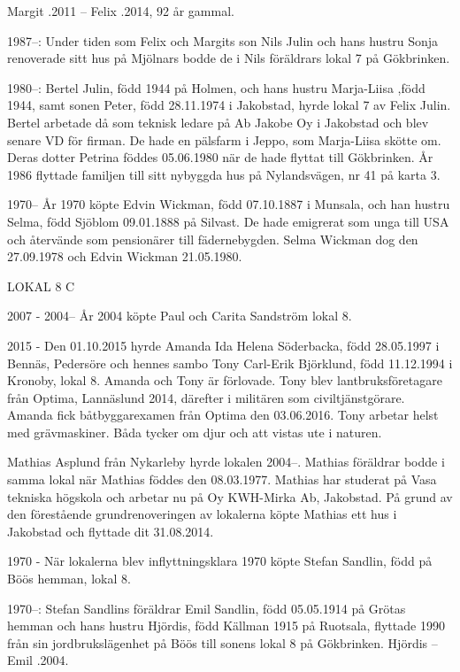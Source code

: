 Margit .2011  --  Felix .2014, 92 år gammal.


1987--:	Under tiden som Felix och Margits son Nils Julin och hans hustru Sonja renoverade sitt hus på Mjölnars bodde de i Nils föräldrars lokal 7 på Gökbrinken.

1980--:	Bertel Julin, född 1944 på Holmen, och hans hustru Marja-Liisa ,född 1944, samt sonen Peter, född 28.11.1974 i Jakobstad, hyrde lokal 7 av Felix Julin. Bertel arbetade då som teknisk ledare på Ab Jakobe Oy i Jakobstad och blev senare VD för firman. De hade en pälsfarm i Jeppo, som Marja-Liisa skötte om. Deras dotter Petrina föddes 05.06.1980 när de hade flyttat till Gökbrinken. År 1986 flyttade familjen till sitt nybyggda hus på Nylandsvägen, nr 41 på karta 3.

 1970--
År 1970 köpte Edvin Wickman, född 07.10.1887 i Munsala, och han hustru Selma, född Sjöblom 09.01.1888 på Silvast. De hade emigrerat som unga till USA och återvände som pensionärer till fädernebygden. Selma Wickman dog den 27.09.1978 och Edvin Wickman 21.05.1980.


LOKAL 8 C

 2007 -
 2004--
År 2004 köpte Paul och Carita Sandström lokal 8.

	2015 -
Den 01.10.2015 hyrde Amanda Ida Helena Söderbacka, född 28.05.1997 i Bennäs, Pedersöre och hennes sambo Tony Carl-Erik Björklund, född 11.12.1994 i Kronoby, lokal 8. Amanda och Tony är förlovade. Tony blev lantbruksföretagare från Optima, Lannäslund 2014, därefter i militären som civiltjänstgörare. Amanda fick båtbyggarexamen från Optima den 03.06.2016. Tony arbetar helst med grävmaskiner. Båda tycker om djur och att vistas ute i naturen.

Mathias Asplund från Nykarleby hyrde lokalen 2004--. Mathias föräldrar bodde i samma lokal när Mathias föddes den 08.03.1977. Mathias har studerat på Vasa tekniska högskola och arbetar nu på Oy KWH-Mirka Ab, Jakobstad. På grund av den förestående grundrenoveringen av lokalerna köpte Mathias ett hus i Jakobstad och flyttade dit 31.08.2014.

 1970 -
När lokalerna blev inflyttningsklara 1970 köpte Stefan Sandlin, född på Böös hemman, lokal 8.

1970--:	Stefan Sandlins föräldrar Emil Sandlin, född 05.05.1914 på Grötas hemman och hans hustru Hjördis, född  Källman 1915 på Ruotsala, flyttade 1990 från sin jordbrukslägenhet på Böös till sonens lokal 8 på Gökbrinken.
Hjördis   --  Emil .2004.

